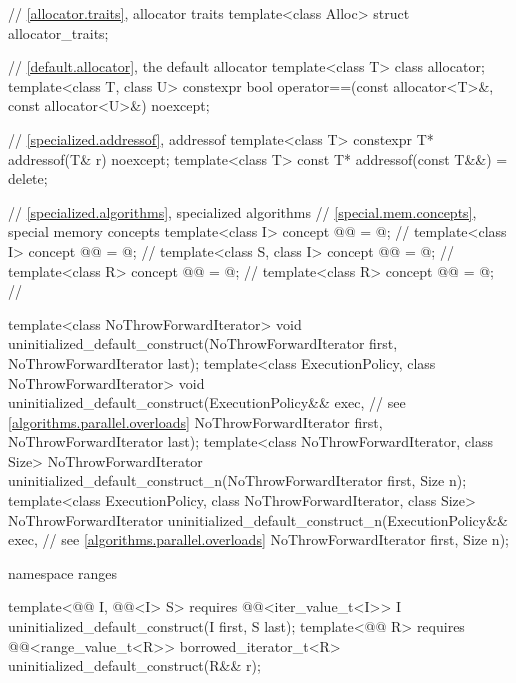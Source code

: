 \begin{codeblock}
{  // \ref{allocator.traits}, allocator traits
  template<class Alloc> struct allocator_traits;

  // \ref{default.allocator}, the default allocator
  template<class T> class allocator;
  template<class T, class U>
    constexpr bool operator==(const allocator<T>&, const allocator<U>&) noexcept;

  // \ref{specialized.addressof}, addressof
  template<class T>
    constexpr T* addressof(T& r) noexcept;
  template<class T>
    const T* addressof(const T&&) = delete;

  // \ref{specialized.algorithms}, specialized algorithms
  // \ref{special.mem.concepts}, special memory concepts
  template<class I>
    concept @@ = @\seebelow@;    // \expos
  template<class I>
    concept @@ = @\seebelow@;  // \expos
  template<class S, class I>
    concept @@ = @\seebelow@;      // \expos
  template<class R>
    concept @@ = @\seebelow@;       // \expos
  template<class R>
    concept @@ = @\seebelow@;     // \expos

  template<class NoThrowForwardIterator>
    void uninitialized_default_construct(NoThrowForwardIterator first,
                                         NoThrowForwardIterator last);
  template<class ExecutionPolicy, class NoThrowForwardIterator>
    void uninitialized_default_construct(ExecutionPolicy&& exec,        // see \ref{algorithms.parallel.overloads}
                                         NoThrowForwardIterator first,
                                         NoThrowForwardIterator last);
  template<class NoThrowForwardIterator, class Size>
    NoThrowForwardIterator
      uninitialized_default_construct_n(NoThrowForwardIterator first, Size n);
  template<class ExecutionPolicy, class NoThrowForwardIterator, class Size>
    NoThrowForwardIterator
      uninitialized_default_construct_n(ExecutionPolicy&& exec,         // see \ref{algorithms.parallel.overloads}
                                        NoThrowForwardIterator first, Size n);

  namespace ranges {
    template<@@ I, @@<I> S>
      requires @@<iter_value_t<I>>
        I uninitialized_default_construct(I first, S last);
    template<@@ R>
      requires @@<range_value_t<R>>
        borrowed_iterator_t<R> uninitialized_default_construct(R&& r);

}}
\end{codeblock}
